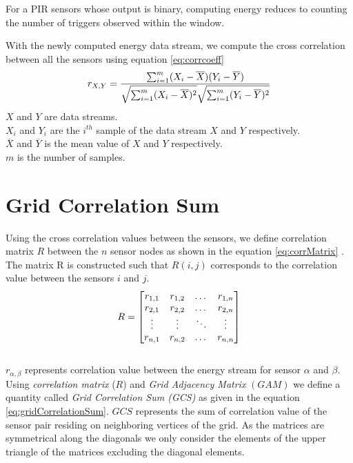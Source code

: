 For a PIR sensors whose output is binary, computing energy reduces to counting the number of triggers observed within the window.

With the newly computed energy data stream, we compute the cross correlation between all the sensors using equation \ref{eq:corrcoeff}
\begin{equation}
\label{eq:corrcoeff}
r_{X,Y}=\frac{\sum_{i=1}^{m}(X_i-\overline{X})(Y_i-\overline{Y})}{\sqrt{\sum_{i=1}^{m}(X_i-\overline{X})^2}\sqrt{\sum_{i=1}^{m}(Y_i-\overline{Y})^2}} \\
\end{equation}
$X$ and $Y$ are data streams.\\
$X_i$ and $Y_i$ are the $i^{th}$ sample of the data stream $X$ and $Y$ respectively.\\
$\overline{X}$ and $\overline{Y}$ is the mean value of $X$ and $Y$ respectively.\\
$m$ is the number of samples.\\

\section{Grid Correlation Sum}
\label{sec:gcs}
Using the cross correlation values between the sensors, we define correlation matrix $R$ between the $n$ sensor nodes as shown in the equation \ref{eq:corrMatrix} . The matrix R is constructed such that $R(i,j)$ corresponds to the correlation value between the sensors $i$ and $j$.
\begin{equation}
\label{eq:corrMatrix}
\centering
R = 
\begin{bmatrix}
    r_{1,1} & r_{1,2} & \dots  & r_{1,n} \\
    r_{2,1} & r_{2,2}  & \dots  & r_{2,n} \\
    \vdots & \vdots  & \ddots & \vdots \\
    r_{n,1} & r_{n,2}  & \dots  & r_{n,n}
\end{bmatrix}
\end{equation}\\
$r_{\alpha,\beta}$ represents correlation value between the energy stream for sensor $\alpha$ and $\beta$.\\


Using \textit{correlation matrix} ($R$) and \textit{Grid Adjacency Matrix} $(GAM)$ we define a quantity called \textit{Grid Correlation Sum (GCS)} as given in the equation \ref{eq:gridCorrelationSum}. $GCS$ represents the sum of correlation value of the sensor pair residing on neighboring vertices of the grid.
As the matrices are symmetrical along the diagonals we only consider the elements of the upper triangle of the matrices excluding the diagonal elements. 

